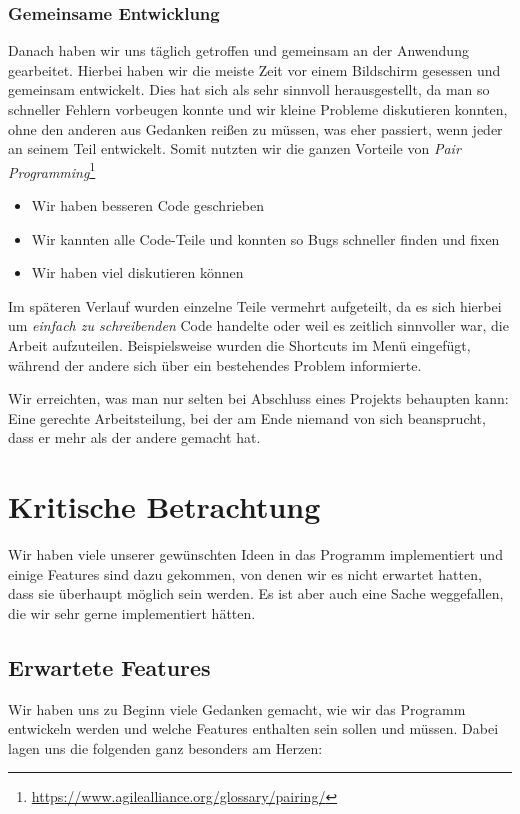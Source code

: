 \subsubsection{Gemeinsame Entwicklung}
Danach haben wir uns täglich getroffen und gemeinsam an der Anwendung gearbeitet. Hierbei haben wir die meiste Zeit vor einem Bildschirm gesessen und gemeinsam entwickelt. Dies hat sich als sehr sinnvoll herausgestellt, da man so schneller Fehlern vorbeugen konnte und wir kleine Probleme diskutieren konnten, ohne den anderen aus Gedanken reißen zu müssen, was eher passiert, wenn jeder an seinem Teil entwickelt. Somit nutzten wir die ganzen Vorteile von \textit{Pair Programming}\footnote{\url{https://www.agilealliance.org/glossary/pairing/}}

\begin{itemize}
\item Wir haben besseren Code geschrieben
\item Wir kannten alle Code-Teile und konnten so Bugs schneller finden und fixen
\item Wir haben viel diskutieren können
\end{itemize}

Im späteren Verlauf wurden einzelne Teile vermehrt aufgeteilt, da es sich hierbei um \textit{einfach zu schreibenden} Code handelte oder weil es zeitlich sinnvoller war, die Arbeit aufzuteilen. Beispielsweise wurden die Shortcuts im Menü eingefügt, während der andere sich über ein bestehendes Problem informierte.

Wir erreichten, was man nur selten bei Abschluss eines Projekts behaupten kann: Eine gerechte Arbeitsteilung, bei der am Ende niemand von sich beansprucht, dass er mehr als der andere gemacht hat.
\section{Kritische Betrachtung}\label{sec:kritische-betrachtung}
Wir haben viele unserer gewünschten Ideen in das Programm implementiert und einige Features sind dazu gekommen, von denen wir es nicht erwartet hatten, dass sie überhaupt möglich sein werden. Es ist aber auch eine Sache weggefallen, die wir sehr gerne implementiert hätten.

\subsection{Erwartete Features}
Wir haben uns zu Beginn viele Gedanken gemacht, wie wir das Programm entwickeln werden und welche Features enthalten sein sollen und müssen. Dabei lagen uns die folgenden ganz besonders am Herzen:

